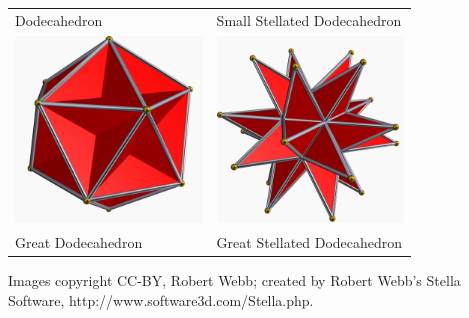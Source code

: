 \documentclass{minimal}
\begin{document}
\begin{tabular}{%
	>{\centering\let\newline\\\arraybackslash\hspace{0pt}}p{0.4\linewidth}
	>{\centering\let\newline\\\arraybackslash\hspace{0pt}}p{0.4\linewidth}
}
Dodecahedron & Small Stellated Dodecahedron \\
\includegraphics[scale=0.25]{Great_dodecahedron.png} &
\includegraphics[scale=0.25]{Great_stellated_dodecahedron.png} \\
Great Dodecahedron & Great Stellated Dodecahedron \\
\end{tabular}

\parbox{\linewidth}{\fontsize{8pt}{9pt}\selectfont\centering
Images copyright CC-BY, Robert Webb; created by Robert
Webb's Stella Software,
http://www.software3d.com/Stella.php.}
\end{document}
